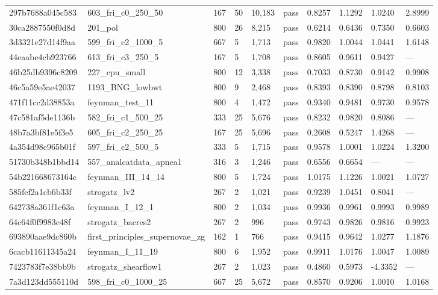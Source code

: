 \begin{longtable}{llllllllll}
297b7688a045c583 & 603\_fri\_c0\_250\_50 & 167 & 50 & 10,183 & pass & 0.8257 & 1.1292 & 1.0240 & 2.8999\\
30ca2887550f0d8d & 201\_pol & 800 & 26 & 8,215 & pass & 0.6214 & 0.6436 & 0.7350 & 0.6603\\
3d3321e27d14f9aa & 599\_fri\_c2\_1000\_5 & 667 & 5 & 1,713 & pass & 0.9820 & 1.0044 & 1.0441 & 1.6148\\
44eaabe4cb923766 & 613\_fri\_c3\_250\_5 & 167 & 5 & 1,708 & pass & 0.8605 & 0.9611 & 0.9427 & ---\\
46b25db9396c8209 & 227\_cpu\_small & 800 & 12 & 3,338 & pass & 0.7033 & 0.8730 & 0.9142 & 0.9908\\
46c5a59e5ae42037 & 1193\_BNG\_lowbwt & 800 & 9 & 2,468 & pass & 0.8393 & 0.8390 & 0.8798 & 0.8103\\
471f11cc2d38853a & feynman\_test\_11 & 800 & 4 & 1,472 & pass & 0.9340 & 0.9481 & 0.9730 & 0.9578\\
47c581af5de1136b & 582\_fri\_c1\_500\_25 & 333 & 25 & 5,676 & pass & 0.8232 & 0.9820 & 0.8086 & ---\\
48b7a3bf81e5f3e5 & 605\_fri\_c2\_250\_25 & 167 & 25 & 5,696 & pass & 0.2608 & 0.5247 & 1.4268 & ---\\
4a354d98c965b01f & 597\_fri\_c2\_500\_5 & 333 & 5 & 1,715 & pass & 0.9578 & 1.0001 & 1.0224 & 1.3200\\
51730b348b1bbd14 & 557\_analcatdata\_apnea1 & 316 & 3 & 1,246 & pass & 0.6556 & 0.6654 & --- & ---\\
54b221668673164c & feynman\_III\_14\_14 & 800 & 5 & 1,724 & pass & 1.0175 & 1.1226 & 1.0021 & 1.0727\\
585fef2a1cb6b33f & strogatz\_lv2 & 267 & 2 & 1,021 & pass & 0.9239 & 1.0451 & 0.8041 & ---\\
642738a361f1c63a & feynman\_I\_12\_1 & 800 & 2 & 1,034 & pass & 0.9936 & 0.9961 & 0.9993 & 0.9989\\
64c64f0f9983c48f & strogatz\_bacres2 & 267 & 2 & 996 & pass & 0.9743 & 0.9826 & 0.9816 & 0.9923\\
693890aae9dc860b & first\_principles\_supernovae\_zg & 162 & 1 & 766 & pass & 0.9415 & 0.9642 & 1.0277 & 1.1876\\
6cacb11611345a24 & feynman\_I\_11\_19 & 800 & 6 & 1,952 & pass & 0.9911 & 1.0176 & 1.0047 & 1.0089\\
7423783f7e38bb9b & strogatz\_shearflow1 & 267 & 2 & 1,023 & pass & 0.4860 & 0.5973 & -4.3352 & ---\\
7a3d123dd555110d & 598\_fri\_c0\_1000\_25 & 667 & 25 & 5,672 & pass & 0.8570 & 0.9206 & 1.0010 & 1.0168\\

\end{longtable}
